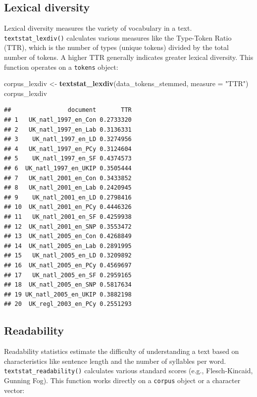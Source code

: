 \documentclass[
]{book}
\newenvironment{Shaded}{\begin{snugshade}}{\end{snugshade}}
\newcommand{\AttributeTok}[1]{\textcolor[rgb]{0.13,0.29,0.53}{#1}}
\newcommand{\FunctionTok}[1]{\textcolor[rgb]{0.13,0.29,0.53}{\textbf{#1}}}
\newcommand{\NormalTok}[1]{#1}
\newcommand{\OtherTok}[1]{\textcolor[rgb]{0.56,0.35,0.01}{#1}}
\newcommand{\StringTok}[1]{\textcolor[rgb]{0.31,0.60,0.02}{#1}}
\begin{document}
\subsection{Lexical diversity}\label{lexical-diversity}

Lexical diversity measures the variety of vocabulary in a text. \texttt{textstat\_lexdiv()} calculates various measures like the Type-Token Ratio (TTR), which is the number of types (unique tokens) divided by the total number of tokens. A higher TTR generally indicates greater lexical diversity. This function operates on a \texttt{tokens} object:

\begin{Shaded}
\begin{Highlighting}[]
\NormalTok{corpus\_lexdiv }\OtherTok{\textless{}{-}} \FunctionTok{textstat\_lexdiv}\NormalTok{(data\_tokens\_stemmed, }\AttributeTok{measure =} \StringTok{"TTR"}\NormalTok{)}
\NormalTok{corpus\_lexdiv}
\end{Highlighting}
\end{Shaded}

\begin{verbatim}
##                document       TTR
## 1   UK_natl_1997_en_Con 0.2733320
## 2   UK_natl_1997_en_Lab 0.3136331
## 3    UK_natl_1997_en_LD 0.3274956
## 4   UK_natl_1997_en_PCy 0.3124604
## 5    UK_natl_1997_en_SF 0.4374573
## 6  UK_natl_1997_en_UKIP 0.3505444
## 7   UK_natl_2001_en_Con 0.3433852
## 8   UK_natl_2001_en_Lab 0.2420945
## 9    UK_natl_2001_en_LD 0.2798416
## 10  UK_natl_2001_en_PCy 0.4446326
## 11   UK_natl_2001_en_SF 0.4259938
## 12  UK_natl_2001_en_SNP 0.3553472
## 13  UK_natl_2005_en_Con 0.4268849
## 14  UK_natl_2005_en_Lab 0.2891995
## 15   UK_natl_2005_en_LD 0.3209892
## 16  UK_natl_2005_en_PCy 0.4569697
## 17   UK_natl_2005_en_SF 0.2959165
## 18  UK_natl_2005_en_SNP 0.5817634
## 19 UK_natl_2005_en_UKIP 0.3882198
## 20  UK_regl_2003_en_PCy 0.2551293
\end{verbatim}

\subsection{Readability}\label{readability}

Readability statistics estimate the difficulty of understanding a text based on characteristics like sentence length and the number of syllables per word. \texttt{textstat\_readability()} calculates various standard scores (e.g., Flesch-Kincaid, Gunning Fog). This function works directly on a \texttt{corpus} object or a character vector:
\end{document}
